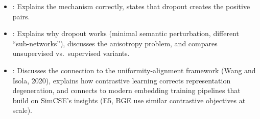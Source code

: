 \begin{interviewq}

\goodgreat
\begin{itemize}
    \item {}: Explains the mechanism correctly, states that
    dropout creates the positive pairs.
    \item {}: Explains why dropout works (minimal semantic
    perturbation, different ``sub-networks''), discusses the
    anisotropy problem, and compares unsupervised vs.\ supervised
    variants.
    \item {}: Discusses the connection to the
    uniformity-alignment framework (Wang and Isola, 2020), explains how
    contrastive learning corrects representation degeneration, and connects
    to modern embedding training pipelines that build on SimCSE's
    insights (E5, BGE use similar contrastive objectives at scale).
\end{itemize}

\end{interviewq}

\vspace{0.5em}

